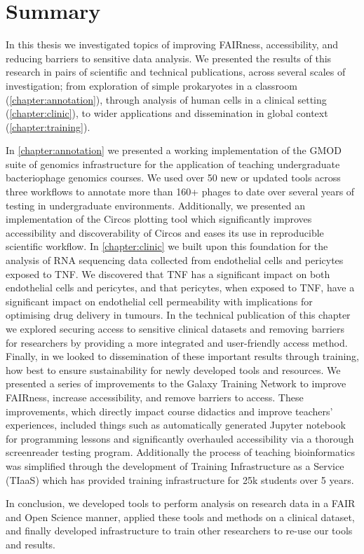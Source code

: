 \chapter{Summary}

In this thesis we investigated topics of improving FAIRness, accessibility, and reducing barriers to sensitive data analysis.
We presented the results of this research in pairs of scientific and technical publications, across several scales of investigation; from exploration of simple prokaryotes in a classroom (\cref{chapter:annotation}), through analysis of human cells in a clinical setting (\cref{chapter:clinic}), to wider applications and dissemination in global context (\cref{chapter:training}).

In \cref{chapter:annotation} we presented a working implementation of the GMOD suite of genomics infrastructure for the application of teaching undergraduate bacteriophage genomics courses.
We used over 50 new or updated tools across three workflows to annotate more than 160+ phages to date over several years of testing in undergraduate environments.
Additionally, we presented an implementation of the Circos plotting tool which significantly improves accessibility and discoverability of Circos and eases its use in reproducible scientific workflow.
In \cref{chapter:clinic} we built upon this foundation for the analysis of RNA sequencing data collected from endothelial cells and pericytes exposed to TNF.
We discovered that TNF has a significant impact on both endothelial cells and pericytes, and that pericytes, when exposed to TNF, have a significant impact on endothelial cell permeability with implications for optimising drug delivery in tumours.
In the technical publication of this chapter we explored securing access to sensitive clinical datasets and removing barriers for researchers by providing a more integrated and user-friendly access method.
Finally, in  we looked to dissemination of these important results through training, how best to ensure sustainability for newly developed tools and resources.
We presented a series of improvements to the Galaxy Training Network to improve FAIRness, increase accessibility, and remove barriers to access.
These improvements, which directly impact course didactics and improve teachers' experiences, included things such as automatically generated Jupyter notebook for programming lessons and significantly overhauled accessibility via a thorough screenreader testing program.
Additionally the process of teaching bioinformatics was simplified through the development of Training Infrastructure as a Service (TIaaS) which has provided training infrastructure for 25k students over 5 years.

In conclusion, we developed tools to perform analysis on research data in a FAIR and Open Science manner, applied these tools and methods on a clinical dataset, and finally developed infrastructure to train other researchers to re-use our tools and results.
